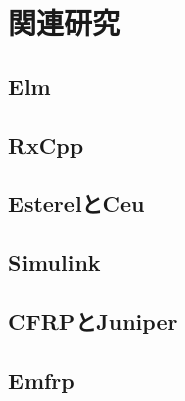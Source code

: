 \chapter{関連研究}
\section{Elm}
\section{RxCpp}
\section{EsterelとCeu}
\section{Simulink}
\section{CFRPとJuniper}
\section{Emfrp}
